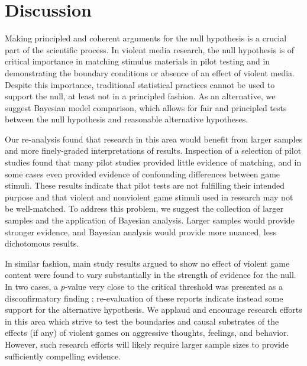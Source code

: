 \documentclass[man]{apa6}
\begin{document}
\section{Discussion} 
Making principled and coherent arguments for the null hypothesis is a crucial part of the scientific process. In violent media research, the null hypothesis is of critical importance in matching stimulus materials in pilot testing and in demonstrating the boundary conditions or absence of an effect of violent media. Despite this importance, traditional statistical practices cannot be used to support the null, at least not in a principled fashion. As an alternative, we suggest Bayesian model comparison, which allows for fair and principled tests between the null hypothesis and reasonable alternative hypotheses.

Our re-analysis found that research in this area would benefit from larger samples and more finely-graded interpretations of results. Inspection of a selection of pilot studies found that many pilot studies provided little evidence of matching, and in some cases even provided evidence of confounding differences between game stimuli. These results indicate that pilot tests are not fulfilling their intended purpose and that violent and nonviolent game stimuli used in research may not be well-matched. To address this problem, we suggest the collection of larger samples and the application of Bayesian analysis. Larger samples would provide stronger evidence, and Bayesian analysis would provide more nuanced, less dichotomous results.

In similar fashion, main study results argued to show no effect of violent game content were found to vary substantially in the strength of evidence for the null. In two cases, a $p$-value very close to the critical threshold was presented as a disconfirmatory finding \citep{Elson:etal:2013,Valadez:Ferguson:2012}; re-evaluation of these reports indicate instead some support for the alternative hypothesis. 
We applaud and encourage research efforts in this area which strive to test the boundaries and causal substrates of the effects (if any) of violent games on aggressive thoughts, feelings, and behavior. However, such research efforts will likely require larger sample sizes to provide sufficiently compelling evidence. 
\end{document}
